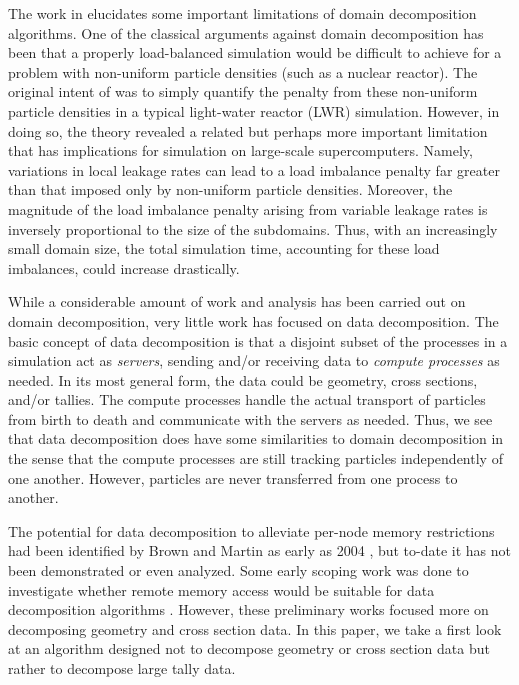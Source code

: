 \documentclass[3p,fleqn]{elsarticle}
\begin{document}
The work in \cite{jcp-siegel-2012-2} elucidates some important limitations of
domain decomposition algorithms. One of the classical arguments against domain
decomposition has been that a properly load-balanced simulation would be
difficult to achieve for a problem with non-uniform particle densities (such as
a nuclear reactor). The original intent of \cite{jcp-siegel-2012-2} was to
simply quantify the penalty from these non-uniform particle densities in a
typical light-water reactor (LWR) simulation. However, in doing so, the theory
revealed a related but perhaps more important limitation that has implications
for simulation on large-scale supercomputers. Namely, variations in local
leakage rates can lead to a load imbalance penalty far greater than that imposed
only by non-uniform particle densities. Moreover, the magnitude of the load
imbalance penalty arising from variable leakage rates is inversely proportional
to the size of the subdomains. Thus, with an increasingly small domain size, the
total simulation time, accounting for these load imbalances, could increase
drastically.

While a considerable amount of work and analysis has been carried out on domain
decomposition, very little work has focused on data decomposition. The basic
concept of data decomposition is that a disjoint subset of the processes in a
simulation act as \emph{servers}, sending and/or receiving data to \emph{compute
  processes} as needed. In its most general form, the data could be geometry,
cross sections, and/or tallies. The compute processes handle the actual
transport of particles from birth to death and communicate with the servers as
needed. Thus, we see that data decomposition does have some similarities to
domain decomposition in the sense that the compute processes are still tracking
particles independently of one another. However, particles are never transferred
from one process to another.

The potential for data decomposition to alleviate per-node memory restrictions
had been identified by Brown and Martin as early as 2004
\cite{trans-brown-2004}, but to-date it has not been demonstrated or even
analyzed. Some early scoping work was done to investigate whether remote memory
access would be suitable for data decomposition algorithms
\cite{pnst-romano-2011}. However, these preliminary works focused more on
decomposing geometry and cross section data. In this paper, we take a first look
at an algorithm designed not to decompose geometry or cross section data but
rather to decompose large tally data.
\end{document}
